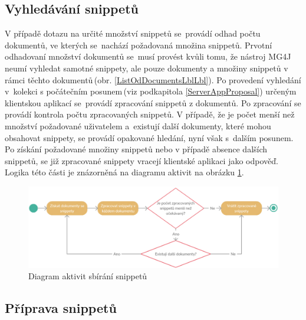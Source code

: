 \subsection*{Vyhledávání snippetů}
\label{SearchSnippetsLbl}
V případě dotazu na určité množství snippetů se~provádí odhad počtu dokumentů, ve kterých se~nachází požadovaná množina snippetů. Prvotní odhadovaní množství dokumentů se~musí provést kvůli tomu, že nástroj MG4J neumí vyhledat samotné snippety, ale pouze dokumenty a množiny snippetů v rámci těchto dokumentů\,(obr. \ref{ListOdDocumentsLblLbl}). Po provedení vyhledání v~kolekci s počátečním posunem\,(viz podkapitola \ref{ServerAppProposal}) určeným klientskou aplikací se~provádí zpracování snippetů z dokumentů. Po zpracování se provádí kontrola počtu zpracovaných snippetů. V případě, že je počet menší než množství požadované uživatelem a~existují další dokumenty, které mohou obsahovat snippety, se provádí opakované hledání, nyní však s~dalším posunem. Po získání požadované množiny snippetů nebo v případě absence dalších snippetů, se již zpracované snippety  vracejí klientské aplikaci jako odpověď. Logika této části je znázorněná na diagramu aktivit na obrázku \ref{ActivityDiagramSnptsProcess}. 




\begin{figure}[H]
\hspace{-0.8cm}
	\includegraphics[scale=0.33]{obrazky-figures/SnippetsProcessActivity.png}
	\caption{Diagram aktivit sbírání snippetů}
    \label{ActivityDiagramSnptsProcess}
\end{figure}


\subsection*{Příprava snippetů}

